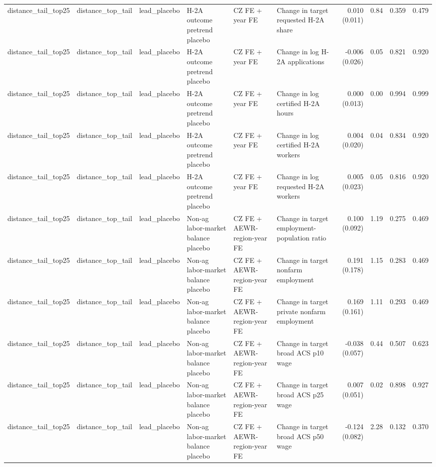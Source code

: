 \begin{tabular}{llllllrrrr}
distance_tail_top25 & distance_top_tail & lead_placebo & H-2A outcome pretrend placebo & CZ FE + year FE & Change in target requested H-2A share & 0.010 (0.011) & 0.84 & 0.359 & 0.479 \\
distance_tail_top25 & distance_top_tail & lead_placebo & H-2A outcome pretrend placebo & CZ FE + year FE & Change in log H-2A applications & -0.006 (0.026) & 0.05 & 0.821 & 0.920 \\
distance_tail_top25 & distance_top_tail & lead_placebo & H-2A outcome pretrend placebo & CZ FE + year FE & Change in log certified H-2A hours & 0.000 (0.013) & 0.00 & 0.994 & 0.999 \\
distance_tail_top25 & distance_top_tail & lead_placebo & H-2A outcome pretrend placebo & CZ FE + year FE & Change in log certified H-2A workers & 0.004 (0.020) & 0.04 & 0.834 & 0.920 \\
distance_tail_top25 & distance_top_tail & lead_placebo & H-2A outcome pretrend placebo & CZ FE + year FE & Change in log requested H-2A workers & 0.005 (0.023) & 0.05 & 0.816 & 0.920 \\
distance_tail_top25 & distance_top_tail & lead_placebo & Non-ag labor-market balance placebo & CZ FE + AEWR-region-year FE & Change in target employment-population ratio & 0.100 (0.092) & 1.19 & 0.275 & 0.469 \\
distance_tail_top25 & distance_top_tail & lead_placebo & Non-ag labor-market balance placebo & CZ FE + AEWR-region-year FE & Change in target nonfarm employment & 0.191 (0.178) & 1.15 & 0.283 & 0.469 \\
distance_tail_top25 & distance_top_tail & lead_placebo & Non-ag labor-market balance placebo & CZ FE + AEWR-region-year FE & Change in target private nonfarm employment & 0.169 (0.161) & 1.11 & 0.293 & 0.469 \\
distance_tail_top25 & distance_top_tail & lead_placebo & Non-ag labor-market balance placebo & CZ FE + AEWR-region-year FE & Change in target broad ACS p10 wage & -0.038 (0.057) & 0.44 & 0.507 & 0.623 \\
distance_tail_top25 & distance_top_tail & lead_placebo & Non-ag labor-market balance placebo & CZ FE + AEWR-region-year FE & Change in target broad ACS p25 wage & 0.007 (0.051) & 0.02 & 0.898 & 0.927 \\
distance_tail_top25 & distance_top_tail & lead_placebo & Non-ag labor-market balance placebo & CZ FE + AEWR-region-year FE & Change in target broad ACS p50 wage & -0.124 (0.082) & 2.28 & 0.132 & 0.370 \\

\end{tabular}
